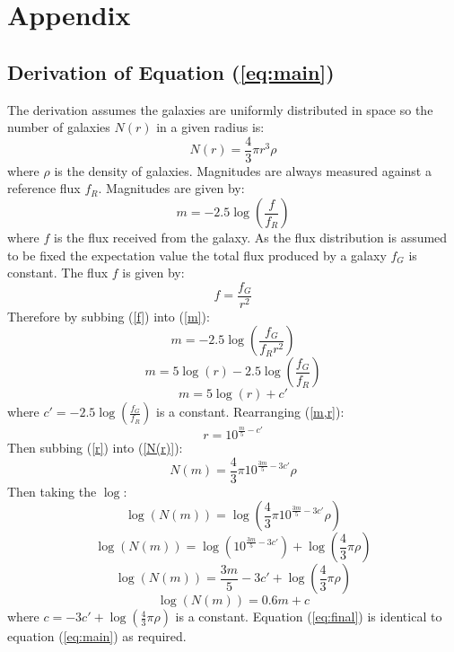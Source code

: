 \documentclass[10pt,a4paper]{article}
\begin{document}



\section*{Appendix}
\subsection*{Derivation of Equation (\ref{eq:main})}

The derivation assumes the galaxies are uniformly distributed in space so the number of galaxies $N(r)$ in a given radius is:
\begin{equation}\label{N(r)}
N(r) = \frac{4}{3} \pi r^3 \rho
\end{equation}
where $\rho$ is the density of galaxies. Magnitudes are always measured against a reference flux $f_R$. Magnitudes are given by:
\begin{equation}\label{m}
m = -2.5 \log(\frac{f}{f_R})
\end{equation}
where $f$ is the flux received from the galaxy. As the flux distribution is assumed to be fixed the expectation value the total flux produced by a galaxy $f_G$ is constant. The flux $f$ is given by:
\begin{equation}\label{f}
f = \frac{f_G}{r^2}
\end{equation}
Therefore by subbing (\ref{f}) into (\ref{m}):
\begin{equation}
m = -2.5\log(\frac{f_G}{f_R r^2})
\end{equation}
\begin{equation}
m = 5\log(r)-2.5\log(\frac{f_G}{f_R})
\end{equation}
\begin{equation}\label{m,r}
m = 5\log(r) + c'
\end{equation}
where $c' = -2.5\log(\frac{f_G}{f_R})$ is a constant. Rearranging (\ref{m,r}): 
\begin{equation}\label{r}
r = 10^{\frac{m}{5}-c'}
\end{equation}
Then subbing (\ref{r}) into (\ref{N(r)}):
\begin{equation}
N(m) = \frac{4}{3} \pi 10^{\frac{3m}{5}-3c'} \rho
\end{equation}
Then taking the $\log$:
\begin{equation}
\log(N(m)) = \log(\frac{4}{3} \pi 10^{\frac{3m}{5}-3c'} \rho)
\end{equation}
\begin{equation}
\log(N(m)) = \log(10^{\frac{3m}{5}-3c'}) + \log(\frac{4}{3} \pi \rho)
\end{equation}
\begin{equation}
\log(N(m)) = \frac{3m}{5}-3c' + \log(\frac{4}{3} \pi \rho)
\end{equation}
\begin{equation}\label{eq:final}
\log(N(m)) = 0.6m+ c
\end{equation}
where $c = -3c' + \log(\frac{4}{3} \pi \rho)$  is a constant. Equation (\ref{eq:final}) is identical to equation (\ref{eq:main}) as required.

\label{catalogue}
\end{document}
